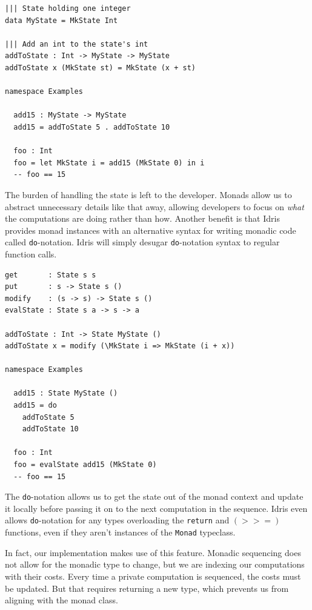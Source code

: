 \documentclass[12pt]{report}
\begin{document}
\begin{lstlisting}[caption={Threading state through function calls, no monad},label={lst:state_example}]
||| State holding one integer
data MyState = MkState Int

||| Add an int to the state's int
addToState : Int -> MyState -> MyState
addToState x (MkState st) = MkState (x + st)

namespace Examples

  add15 : MyState -> MyState
  add15 = addToState 5 . addToState 10

  foo : Int
  foo = let MkState i = add15 (MkState 0) in i
  -- foo == 15
\end{lstlisting}

The burden of handling the state is left to the developer.
Monads allow us to abstract unnecessary details like that away, allowing developers to focus on \textit{what} the computations are doing rather than how.
Another benefit is that Idris provides monad instances with an alternative syntax for writing monadic code called \texttt{do}-notation.
Idris will simply desugar \texttt{do}-notation syntax to regular function calls.

\begin{lstlisting}[caption={Threading state through function calls with do-notation},label={lst:threading_state_do_notation}]
get       : State s s
put       : s -> State s ()
modify    : (s -> s) -> State s ()
evalState : State s a -> s -> a

addToState : Int -> State MyState ()
addToState x = modify (\MkState i => MkState (i + x))

namespace Examples

  add15 : State MyState ()
  add15 = do
    addToState 5
    addToState 10

  foo : Int
  foo = evalState add15 (MkState 0)
  -- foo == 15
\end{lstlisting}

The \texttt{do}-notation allows us to get the state out of the monad context and update it locally before passing it on to the next computation in the sequence.
Idris even allows \texttt{do}-notation for any types overloading the \texttt{return} and $(>>=)$ functions, even if they aren't instances of the \texttt{Monad} typeclass.

In fact, our implementation makes use of this feature.
Monadic sequencing does not allow for the monadic type to change, but we are indexing our computations with their costs.
Every time a private computation is sequenced, the costs must be updated.
But that requires returning a new type, which prevents us from aligning with the monad class.
\end{document}
